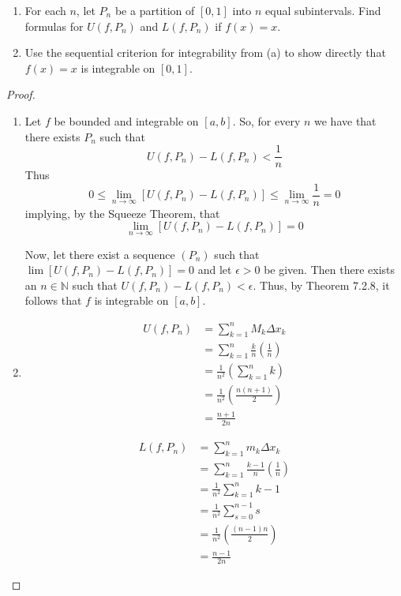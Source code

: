 \begin{enumerate}
\begin{enumerate}
        \item For each \( n \), let \( P_n \) be a partition of \( [0,1] \) into \( n \) equal subintervals. Find formulas for \( U(f,P_n) \) and \( L(f,P_n) \) if \( f(x) = x \).
        
        \item Use the sequential criterion for integrability from (a) to show directly that \( f(x) = x \) is integrable on \( [0,1] \). 
    \end{enumerate}
    
    \begin{proof}
    \begin{enumerate}
        \item Let \( f \) be bounded and integrable on \( [a,b] \). So, for every \( n \) we have that there exists \( P_n \) such that
        \[
        U(f,P_n) - L(f,P_n) < \frac{1}{n} 
        \]
        Thus
        \[
        0 \leq \lim_{n \rightarrow \infty} [U(f,P_n) - L(f,P_n)] \leq \lim_{n \rightarrow \infty} \frac{1}{n} = 0
        \]
        implying, by the Squeeze Theorem, that
        \[
        \lim_{n \rightarrow \infty} [U(f,P_n) - L(f,P_n)] = 0 
        \]
        
        Now, let there exist a sequence \( (P_n) \) such that \( \lim [U(f,P_n)-L(f,P_n)] = 0 \) and let \( \epsilon > 0 \) be given. Then there exists an \( n \in \mathbb{N} \) such that \( U(f,P_n)-L(f,P_n) < \epsilon \). Thus, by Theorem 7.2.8, it follows that \( f \) is integrable on \( [a,b] \). 
        
        \item 
        \begin{align*}
            U(f,P_n) &= \sum_{k=1}^{n} M_k \Delta x_k \\
            &= \sum_{k=1}^{n} \frac{k}{n}\left( \frac{1}{n} \right) \\
            &= \frac{1}{n^2} \left( \sum_{k=1}^n k \right) \\
            &= \frac{1}{n^2} \left( \frac{n(n+1)}{2} \right) \\
            &= \frac{n+1}{2n}
        \end{align*}
        
        \begin{align*}
            L(f,P_n) &= \sum_{k=1}^{n} m_k \Delta x_k \\
            &= \sum_{k=1}^{n} \frac{k-1}{n}\left( \frac{1}{n} \right) \\
            &= \frac{1}{n^2}\sum_{k=1}^{n} k-1 \\
            &= \frac{1}{n^2}\sum_{s=0}^{n-1} s \\
            &= \frac{1}{n^2}\left( \frac{(n-1)n}{2} \right) \\
            &= \frac{n-1}{2n}
        \end{align*}
        

\end{enumerate}
\end{proof}
\end{enumerate}
